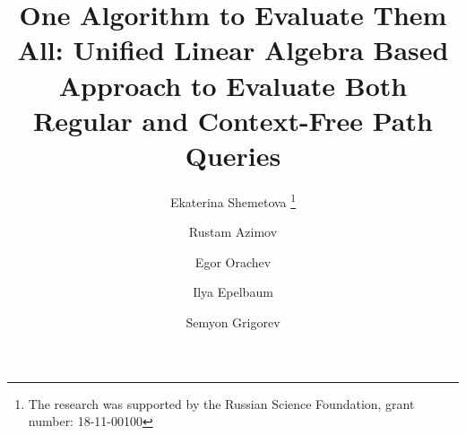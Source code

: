 \newlength\Origarrayrulewidth

\newcommand{\Cline}[1]{%
	\noalign{\global\setlength\Origarrayrulewidth{\arrayrulewidth}}%
	\noalign{\global\setlength\arrayrulewidth{3pt}}\cline{#1}%
	\noalign{\global\setlength\arrayrulewidth{\Origarrayrulewidth}}%
}

\newcommand\Thickvrule[1]{%
	\multicolumn{1}{!{\vrule width 2pt}c!{\vrule width 2pt}}{#1}%
}

\newcommand\Thickvrulel[1]{%
	\multicolumn{1}{!{\vrule width 2pt}c}{#1}%
}

\newcommand\Thickvruler[1]{%
	\multicolumn{1}{c!{\vrule width 2pt}}{#1}%
}

\newcommand\mc{\multicolumn{1}{c}{\cellcolor{lightgray}\textbf{1}}}
\newcommand{\term}[1]{\emph{#1}}
%
%


\title{One Algorithm to Evaluate Them All: Unified Linear Algebra Based Approach to Evaluate Both Regular and Context-Free Path Queries%
}


\author{Ekaterina Shemetova  \thanks {The research was supported by the Russian Science Foundation, grant number: 18-11-00100}       \and
        Rustam Azimov \and
            Egor Orachev \and
             Ilya Epelbaum \and
             Semyon Grigorev
}


